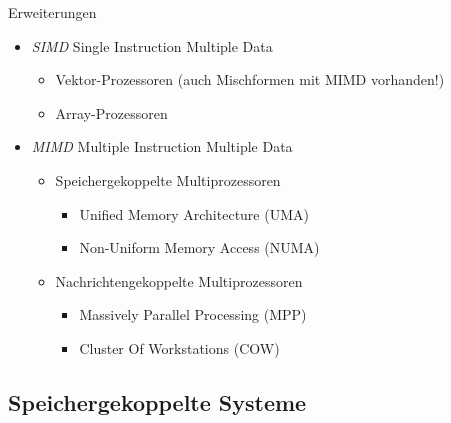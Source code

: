 \begin{bonus}{Erweiterungen}
    \begin{itemize}
        \item \emph{SIMD} Single Instruction Multiple Data
              \begin{itemize}
                  \item Vektor-Prozessoren (auch Mischformen mit MIMD vorhanden!)
                  \item Array-Prozessoren
              \end{itemize}
        \item \emph{MIMD} Multiple Instruction Multiple Data
              \begin{itemize}
                  \item Speichergekoppelte Multiprozessoren
                        \begin{itemize}
                            \item Unified Memory Architecture (UMA)
                            \item Non-Uniform Memory Access (NUMA)
                        \end{itemize}
                  \item Nachrichtengekoppelte Multiprozessoren
                        \begin{itemize}
                            \item Massively Parallel Processing (MPP)
                            \item Cluster Of Workstations (COW)
                        \end{itemize}
              \end{itemize}
    \end{itemize}
\end{bonus}

\subsection{Speichergekoppelte Systeme}

